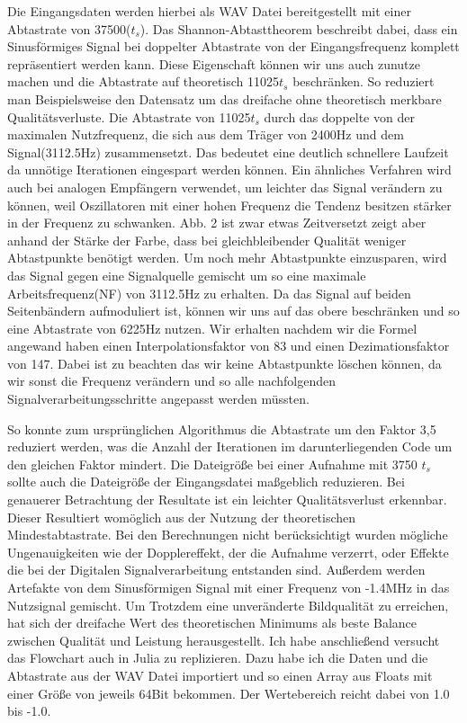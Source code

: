\begin{multicols*}{2}
    Die Eingangsdaten werden hierbei als WAV Datei bereitgestellt mit einer Abtastrate von 37500(\( t_s \)). Das Shannon-Abtasttheorem beschreibt dabei, dass ein Sinusförmiges Signal bei doppelter Abtastrate von der Eingangsfrequenz komplett repräsentiert werden kann. Diese Eigenschaft können wir uns auch zunutze machen und die Abtastrate auf theoretisch 11025\( t_s \) beschränken. So reduziert man Beispielsweise den Datensatz um das dreifache ohne theoretisch merkbare Qualitätsverluste. Die Abtastrate von 11025\( t_s \) durch das doppelte von der maximalen Nutzfrequenz, die sich aus dem Träger von 2400Hz und dem Signal(3112.5Hz) zusammensetzt. Das bedeutet eine deutlich schnellere Laufzeit da unnötige Iterationen eingespart werden können. Ein ähnliches Verfahren wird auch bei analogen Empfängern verwendet, um leichter das Signal verändern zu können, weil Oszillatoren mit einer hohen Frequenz die Tendenz besitzen stärker in der Frequenz zu schwanken. 
    Abb. 2 ist zwar etwas Zeitversetzt zeigt aber anhand der Stärke der Farbe, dass bei gleichbleibender Qualität weniger Abtastpunkte benötigt werden. Um noch mehr Abtastpunkte einzusparen, wird das Signal gegen eine Signalquelle gemischt um so eine maximale Arbeitsfrequenz(NF) von 3112.5Hz zu erhalten. Da das Signal auf beiden Seitenbändern aufmoduliert ist, können wir uns auf das obere beschränken und so eine Abtastrate von 6225Hz nutzen. Wir erhalten nachdem wir die Formel angewand haben einen Interpolationsfaktor von 83 und einen Dezimationsfaktor von 147. Dabei ist zu beachten das wir keine Abtastpunkte löschen können, da wir sonst die Frequenz verändern und so alle nachfolgenden Signalverarbeitungsschritte angepasst werden müssten.

    So konnte zum ursprünglichen Algorithmus die Abtastrate um den Faktor 3,5 reduziert werden, was die Anzahl der Iterationen im darunterliegenden Code um den gleichen Faktor mindert. Die Dateigröße bei einer Aufnahme mit 3750 \( t_s \) sollte auch die Dateigröße der Eingangsdatei maßgeblich reduzieren. Bei genauerer Betrachtung der Resultate ist ein leichter Qualitätsverlust erkennbar. Dieser Resultiert womöglich aus der Nutzung der theoretischen Mindestabtastrate. Bei den Berechnungen nicht berücksichtigt wurden mögliche Ungenauigkeiten wie der Dopplereffekt, der die Aufnahme verzerrt, oder Effekte die bei der Digitalen Signalverarbeitung entstanden sind. Außerdem werden Artefakte von dem Sinusförmigen Signal mit einer Frequenz von -1.4MHz in das Nutzsignal gemischt. Um Trotzdem eine unveränderte Bildqualität zu erreichen, hat sich der dreifache Wert des theoretischen Minimums als beste Balance zwischen Qualität und Leistung herausgestellt.
    Ich habe anschließend versucht das Flowchart auch in Julia zu replizieren. Dazu habe ich die Daten und die Abtastrate aus der WAV Datei importiert und so einen Array aus Floats mit einer Größe von jeweils 64Bit bekommen. Der Wertebereich reicht dabei von 1.0 bis -1.0.
   

\end{multicols*}
